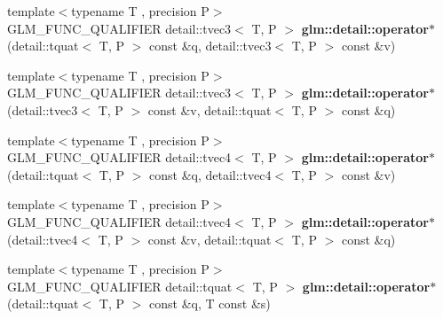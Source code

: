 \begin{DoxyCompactItemize}
\item 
{\footnotesize template$<$typename T , precision P$>$ }\\G\+L\+M\+\_\+\+F\+U\+N\+C\+\_\+\+Q\+U\+A\+L\+I\+F\+I\+ER detail\+::tvec3$<$ T, P $>$ {\bfseries glm\+::detail\+::operator$\ast$} (detail\+::tquat$<$ T, P $>$ const \&q, detail\+::tvec3$<$ T, P $>$ const \&v)\hypertarget{glm_2include_2glm_2gtc_2quaternion_8inl_a217e4015819bcaf1cc8f30c99698b102}{}\label{glm_2include_2glm_2gtc_2quaternion_8inl_a217e4015819bcaf1cc8f30c99698b102}

\item 
{\footnotesize template$<$typename T , precision P$>$ }\\G\+L\+M\+\_\+\+F\+U\+N\+C\+\_\+\+Q\+U\+A\+L\+I\+F\+I\+ER detail\+::tvec3$<$ T, P $>$ {\bfseries glm\+::detail\+::operator$\ast$} (detail\+::tvec3$<$ T, P $>$ const \&v, detail\+::tquat$<$ T, P $>$ const \&q)\hypertarget{glm_2include_2glm_2gtc_2quaternion_8inl_a1e3484b9cf1adf99d5cdefa17192960f}{}\label{glm_2include_2glm_2gtc_2quaternion_8inl_a1e3484b9cf1adf99d5cdefa17192960f}

\item 
{\footnotesize template$<$typename T , precision P$>$ }\\G\+L\+M\+\_\+\+F\+U\+N\+C\+\_\+\+Q\+U\+A\+L\+I\+F\+I\+ER detail\+::tvec4$<$ T, P $>$ {\bfseries glm\+::detail\+::operator$\ast$} (detail\+::tquat$<$ T, P $>$ const \&q, detail\+::tvec4$<$ T, P $>$ const \&v)\hypertarget{glm_2include_2glm_2gtc_2quaternion_8inl_afb46a99a6d108f6140e06681e2b3be04}{}\label{glm_2include_2glm_2gtc_2quaternion_8inl_afb46a99a6d108f6140e06681e2b3be04}

\item 
{\footnotesize template$<$typename T , precision P$>$ }\\G\+L\+M\+\_\+\+F\+U\+N\+C\+\_\+\+Q\+U\+A\+L\+I\+F\+I\+ER detail\+::tvec4$<$ T, P $>$ {\bfseries glm\+::detail\+::operator$\ast$} (detail\+::tvec4$<$ T, P $>$ const \&v, detail\+::tquat$<$ T, P $>$ const \&q)\hypertarget{glm_2include_2glm_2gtc_2quaternion_8inl_a55d4ec031a5b440d34d6f5cb475b621d}{}\label{glm_2include_2glm_2gtc_2quaternion_8inl_a55d4ec031a5b440d34d6f5cb475b621d}

\item 
{\footnotesize template$<$typename T , precision P$>$ }\\G\+L\+M\+\_\+\+F\+U\+N\+C\+\_\+\+Q\+U\+A\+L\+I\+F\+I\+ER detail\+::tquat$<$ T, P $>$ {\bfseries glm\+::detail\+::operator$\ast$} (detail\+::tquat$<$ T, P $>$ const \&q, T const \&s)\hypertarget{glm_2include_2glm_2gtc_2quaternion_8inl_ae7c9ae2e54227c51aa9f316e59504a64}{}\label{glm_2include_2glm_2gtc_2quaternion_8inl_ae7c9ae2e54227c51aa9f316e59504a64}


\end{DoxyCompactItemize}
